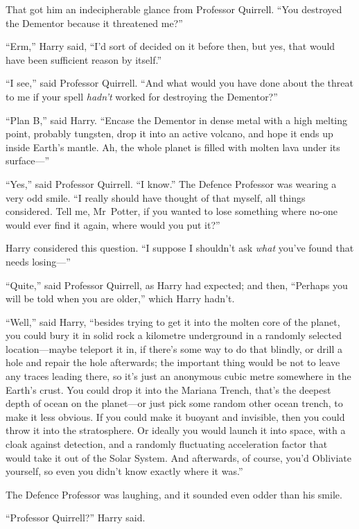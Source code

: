That got him an indecipherable glance from Professor Quirrell.
“You destroyed the Dementor because it threatened me?”

“Erm,” Harry said,
“I’d sort of decided on it before then, but yes, that would have been sufficient reason by itself.”

“I see,” said Professor Quirrell.
“And what would you have done about the threat to me if your spell \emph{hadn’t} worked for destroying the Dementor?”

“Plan B,” said Harry.
“Encase the Dementor in dense metal with a high melting point, probably tungsten, drop it into an active volcano, and hope it ends up inside Earth’s mantle. Ah, the whole planet is filled with molten lava under its surface—”

“Yes,” said Professor Quirrell.
“I know.” The Defence Professor was wearing a very odd smile.
“I really should have thought of that myself, all things considered. Tell me, Mr~Potter, if you wanted to lose something where no-one would ever find it again, where would you put it?”

Harry considered this question.
“I suppose I shouldn’t ask \emph{what} you’ve found that needs losing—”

“Quite,” said Professor Quirrell, as Harry had expected; and then,
“Perhaps you will be told when you are older,” which Harry hadn’t.

“Well,” said Harry, “besides trying to get it into the molten core of the planet, you could bury it in solid rock a kilometre underground in a randomly selected location—maybe teleport it in, if there’s some way to do that blindly, or drill a hole and repair the hole afterwards; the important thing would be not to leave any traces leading there, so it’s just an anonymous cubic metre somewhere in the Earth’s crust. You could drop it into the Mariana Trench, that’s the deepest depth of ocean on the planet—or just pick some random other ocean trench, to make it less obvious. If you could make it buoyant and invisible, then you could throw it into the stratosphere. Or ideally you would launch it into space, with a cloak against detection, and a randomly fluctuating acceleration factor that would take it out of the Solar System. And afterwards, of course, you’d Obliviate yourself, so even you didn’t know exactly where it was.”

The Defence Professor was laughing, and it sounded even odder than his smile.

“Professor Quirrell?” Harry said.


